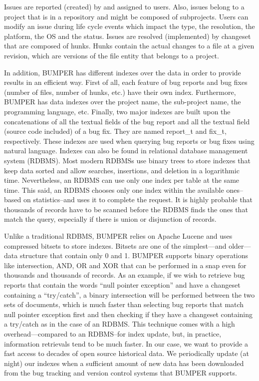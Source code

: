 \documentclass[conference]{IEEEtran}
\begin{document}
Issues are reported (created) by and assigned to users.
Also, issues belong to a project that is in a repository and might be composed
of subprojects.
Users can modify an issue during life cycle events which impact the type,
the resolution, the platform, the OS and the status.
Issues are resolved (implemented) by changeset that are composed of hunks.
Hunks contain the actual changes to a file at a given revision,
which are versions of the file entity that belongs to a project.

In addition, BUMPER has different indexes over the data in order to provide
results in an efficient way.
First of all, each feature of bug reports and bug fixes
(number of files, number of hunks, etc.) have their own index.
Furthermore, BUMPER has data indexes over the project name, the sub-project name,
 the programming language, etc.
Finally, two major indexes are built upon the concatenations of all the
textual fields of the bug report and all the textual field
(source code included) of a bug fix.
They are named report\_t and fix\_t, respectively.
These indexes are used when querying bug reports or bug fixes using natural
language.
Indexes can also be found in relational database management system (RDBMS).
Most modern RDBMSs use binary trees to store indexes that keep data sorted and
allow searches, insertions, and deletion in a logarithmic time.
Nevertheless, an RDBMS can use only one index per table at the same time.
This said, an RDBMS chooses only one index within the available ones--based
on statistics--and uses it to complete the request.
It is highly probable that thousands of records have to be scanned before
the RDBMS finds the ones that match the query, especially if there
is union or disjunction of records.

Unlike a traditional RDBMS, BUMPER relies on Apache Lucene and uses compressed
bitsets to store indexes.
Bitsets are one of the simplest---and older---data structure that contain only
0 and 1.
BUMPER supports binary operations like intersection, AND, OR and XOR that
can be performed in a snap even for thousands and thousands of records.
As an example, if we wish to retrieve bug reports that contain the words
``null pointer exception'' and have a changeset containing a ``try/catch'',
a binary intersection will be performed between the two sets of documents,
which is much faster than selecting bug reports that match null pointer
exception first and then checking if they have a changeset containing a
 try/catch as in the case of an RDBMS.
This technique comes with a high overhead—compared to an RDBMS--for
index update, but, in practice, information retrievals tend to be much faster.
In our case, we want to provide a fast access to decades of open source
historical data. We periodically update (at night) our indexes when a
sufficient amount of new data has been downloaded from the bug tracking
and version control systems that BUMPER supports.
\end{document}
